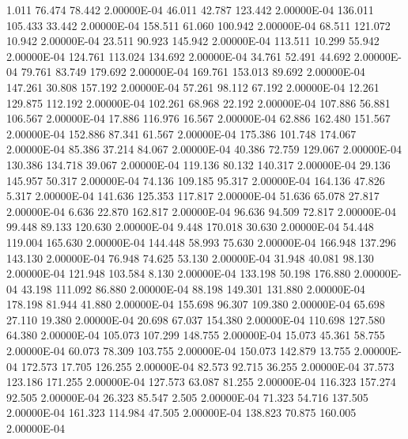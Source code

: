      1.011    76.474    78.442  2.00000E-04
    46.011    42.787   123.442  2.00000E-04
   136.011   105.433    33.442  2.00000E-04
   158.511    61.060   100.942  2.00000E-04
    68.511   121.072    10.942  2.00000E-04
    23.511    90.923   145.942  2.00000E-04
   113.511    10.299    55.942  2.00000E-04
   124.761   113.024   134.692  2.00000E-04
    34.761    52.491    44.692  2.00000E-04
    79.761    83.749   179.692  2.00000E-04
   169.761   153.013    89.692  2.00000E-04
   147.261    30.808   157.192  2.00000E-04
    57.261    98.112    67.192  2.00000E-04
    12.261   129.875   112.192  2.00000E-04
   102.261    68.968    22.192  2.00000E-04
   107.886    56.881   106.567  2.00000E-04
    17.886   116.976    16.567  2.00000E-04
    62.886   162.480   151.567  2.00000E-04
   152.886    87.341    61.567  2.00000E-04
   175.386   101.748   174.067  2.00000E-04
    85.386    37.214    84.067  2.00000E-04
    40.386    72.759   129.067  2.00000E-04
   130.386   134.718    39.067  2.00000E-04
   119.136    80.132   140.317  2.00000E-04
    29.136   145.957    50.317  2.00000E-04
    74.136   109.185    95.317  2.00000E-04
   164.136    47.826     5.317  2.00000E-04
   141.636   125.353   117.817  2.00000E-04
    51.636    65.078    27.817  2.00000E-04
     6.636    22.870   162.817  2.00000E-04
    96.636    94.509    72.817  2.00000E-04
    99.448    89.133   120.630  2.00000E-04
     9.448   170.018    30.630  2.00000E-04
    54.448   119.004   165.630  2.00000E-04
   144.448    58.993    75.630  2.00000E-04
   166.948   137.296   143.130  2.00000E-04
    76.948    74.625    53.130  2.00000E-04
    31.948    40.081    98.130  2.00000E-04
   121.948   103.584     8.130  2.00000E-04
   133.198    50.198   176.880  2.00000E-04
    43.198   111.092    86.880  2.00000E-04
    88.198   149.301   131.880  2.00000E-04
   178.198    81.944    41.880  2.00000E-04
   155.698    96.307   109.380  2.00000E-04
    65.698    27.110    19.380  2.00000E-04
    20.698    67.037   154.380  2.00000E-04
   110.698   127.580    64.380  2.00000E-04
   105.073   107.299   148.755  2.00000E-04
    15.073    45.361    58.755  2.00000E-04
    60.073    78.309   103.755  2.00000E-04
   150.073   142.879    13.755  2.00000E-04
   172.573    17.705   126.255  2.00000E-04
    82.573    92.715    36.255  2.00000E-04
    37.573   123.186   171.255  2.00000E-04
   127.573    63.087    81.255  2.00000E-04
   116.323   157.274    92.505  2.00000E-04
    26.323    85.547     2.505  2.00000E-04
    71.323    54.716   137.505  2.00000E-04
   161.323   114.984    47.505  2.00000E-04
   138.823    70.875   160.005  2.00000E-04
